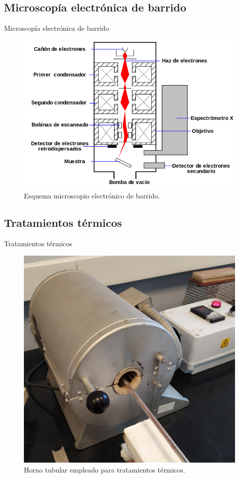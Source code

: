 \documentclass[11pt]{beamer}
\begin{document}
	\subsection{Microscopía electrónica de barrido}
		\begin{frame}{Microscopía electrónica de barrido}
			\begin{figure}[H]
				\centering
				\includegraphics[scale=0.25]{img/SEM.png}
				\caption*{Esquema microscopio electrónico de barrido.}
			\end{figure}
		\end{frame}
		
	\subsection{Tratamientos térmicos}
		\begin{frame}{Tratamientos térmicos}
			\begin{figure}
				\centering
				\includegraphics[scale=0.3]{img/hornito.png}
				\caption*{Horno tubular empleado para tratamientos térmicos.}				
			\end{figure}
		\end{frame}
	
\end{document}
